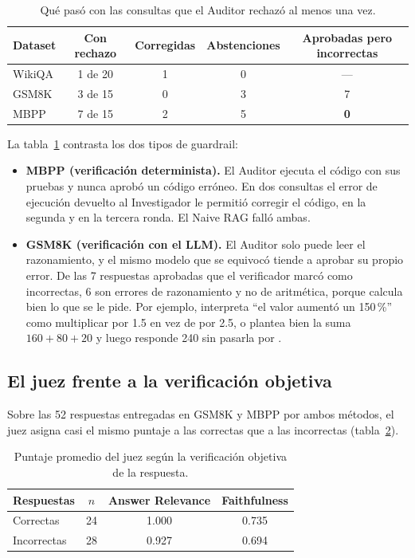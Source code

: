 \begin{table}[ht]
\centering
\caption{Qué pasó con las consultas que el Auditor rechazó al menos una vez.}\label{tab:auditor}
\small
\begin{tabular}{@{}lcccc@{}}
\toprule
Dataset & Con rechazo & Corregidas & Abstenciones & Aprobadas pero incorrectas \\
\midrule
WikiQA & 1 de 20 & 1 & 0 & --- \\
GSM8K  & 3 de 15 & 0 & 3 & 7 \\
MBPP   & 7 de 15 & 2 & 5 & \textbf{0} \\
\bottomrule
\end{tabular}
\end{table}

La tabla~\ref{tab:auditor} contrasta los dos tipos de guardrail:
\begin{itemize}
  \item \textbf{MBPP (verificación determinista).} El Auditor ejecuta el código con sus pruebas y nunca aprobó un código erróneo.
  En dos consultas el error de ejecución devuelto al Investigador le permitió corregir el código, en la segunda y en la tercera ronda.
  El Naive RAG falló ambas.
  \item \textbf{GSM8K (verificación con el LLM).} El Auditor solo puede leer el razonamiento, y el mismo modelo que se equivocó tiende a aprobar su propio error.
  De las 7 respuestas aprobadas que el verificador marcó como incorrectas, 6 son errores de razonamiento y no de aritmética, porque  calcula bien lo que se le pide.
  Por ejemplo, interpreta ``el valor aumentó un 150\,\%'' como multiplicar por 1.5 en vez de por 2.5, o plantea bien la suma $160+80+20$ y luego responde 240 sin pasarla por .
\end{itemize}

\subsection{El juez frente a la verificación objetiva}

Sobre las 52 respuestas entregadas en GSM8K y MBPP por ambos métodos, el juez asigna casi el mismo puntaje a las correctas que a las incorrectas (tabla~\ref{tab:juez}).

\begin{table}[ht]
\centering
\caption{Puntaje promedio del juez según la verificación objetiva de la respuesta.}\label{tab:juez}
\small
\begin{tabular}{@{}lccc@{}}
\toprule
Respuestas & $n$ & Answer Relevance & Faithfulness \\
\midrule
Correctas   & 24 & 1.000 & 0.735 \\
Incorrectas & 28 & 0.927 & 0.694 \\
\bottomrule
\end{tabular}
\end{table}

